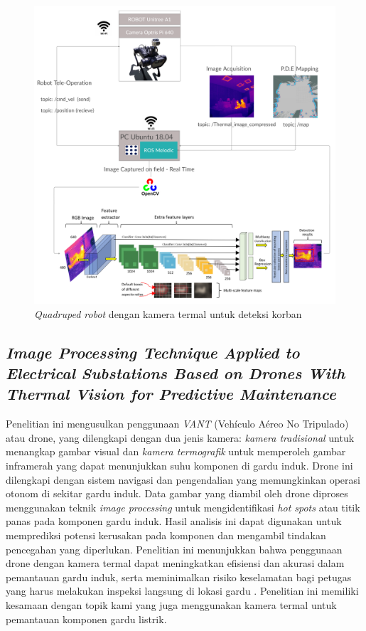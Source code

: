 \begin{figure} [H] \centering
  \includegraphics[scale=0.065]{gambar/unitreea1.png}
  \caption{\emph{Quadruped robot} dengan kamera termal untuk deteksi korban}
  \label{fig:Quadruped  dengan kamera termal untuk deteksi korban}
\end{figure}


\subsection{\emph{Image Processing Technique Applied to Electrical
Substations Based on Drones With Thermal Vision
for Predictive Maintenance}}
Penelitian ini mengusulkan penggunaan \emph{VANT} (Vehículo Aéreo No Tripulado) atau drone, yang dilengkapi dengan dua jenis kamera: \emph{kamera tradisional} untuk menangkap gambar visual dan \emph{kamera termografik} untuk memperoleh gambar inframerah yang dapat menunjukkan suhu komponen di gardu induk. Drone ini dilengkapi dengan sistem navigasi dan pengendalian yang memungkinkan operasi otonom di sekitar gardu induk. Data gambar yang diambil oleh drone diproses menggunakan teknik \emph{image processing} untuk mengidentifikasi \emph{hot spots} atau titik panas pada komponen gardu induk. Hasil analisis ini dapat digunakan untuk memprediksi potensi kerusakan pada komponen dan mengambil tindakan pencegahan yang diperlukan. Penelitian ini menunjukkan bahwa penggunaan drone dengan kamera termal dapat meningkatkan efisiensi dan akurasi dalam pemantauan gardu induk, serta meminimalkan risiko keselamatan bagi petugas yang harus melakukan inspeksi langsung di lokasi gardu \cite{Prieto2022}. Penelitian ini memiliki kesamaan dengan topik kami yang juga menggunakan kamera termal untuk pemantauan komponen gardu listrik.

